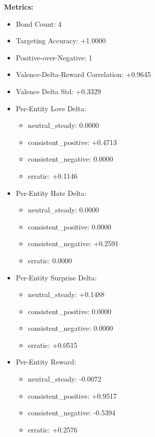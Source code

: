 \documentclass[12pt]{article}
\begin{document}
\textbf{Metrics:}
\begin{itemize}
    \item Bond Count: 4
    \item Targeting Accuracy: +1.0000
    \item Positive-over-Negative: 1
    \item Valence-Delta-Reward Correlation: +0.9645
    \item Valence Delta Std: +0.3329
    \item Per-Entity Love Delta:
        \begin{itemize}
            \item neutral\_steady: 0.0000
            \item consistent\_positive: +0.4713
            \item consistent\_negative: 0.0000
            \item erratic: +0.1146
        \end{itemize}
    \item Per-Entity Hate Delta:
        \begin{itemize}
            \item neutral\_steady: 0.0000
            \item consistent\_positive: 0.0000
            \item consistent\_negative: +0.2591
            \item erratic: 0.0000
        \end{itemize}
    \item Per-Entity Surprise Delta:
        \begin{itemize}
            \item neutral\_steady: +0.1488
            \item consistent\_positive: 0.0000
            \item consistent\_negative: 0.0000
            \item erratic: +0.0515
        \end{itemize}
    \item Per-Entity Reward:
        \begin{itemize}
            \item neutral\_steady: -0.0072
            \item consistent\_positive: +0.9517
            \item consistent\_negative: -0.5394
            \item erratic: +0.2576
        \end{itemize}
\end{itemize}
\end{document}
